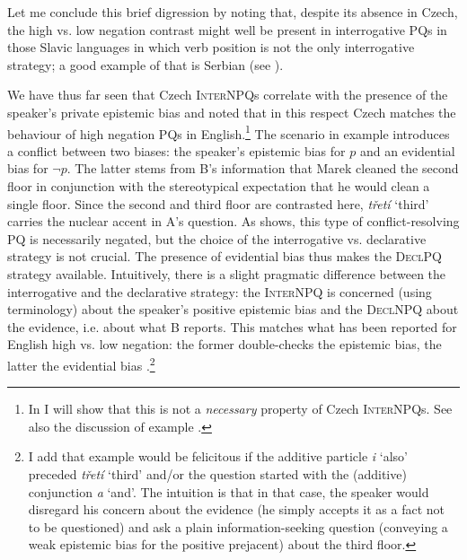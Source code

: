 \documentclass[output=paper,colorlinks,citecolor=brown]{langscibook}
\begin{document}
\noindent Let me conclude this brief digression by noting that, despite its absence in Czech, the high vs. low negation contrast might well be present in interrogative PQs in those Slavic languages in which verb position is not the only interrogative strategy; a good example of that is Serbian (see ).

We have thus far seen that Czech \textsc{InterNPQ}s correlate with the presence of the speaker's private epistemic bias and noted that in this respect Czech matches the behaviour of high negation PQs in English.\footnote{In  I will show that this is not a \textit{necessary} property of Czech \textsc{InterNPQ}s. See also the discussion of example .} The scenario in example  introduces a conflict between two biases: the speaker's epistemic bias for $p$ and an evidential bias for $\neg p$. The latter stems from B's information that Marek cleaned the second floor in conjunction with the stereotypical expectation that he would clean a single floor. Since the second and third floor are contrasted here, \textit{třetí} `third' carries the nuclear accent in A's question. As  shows, this type of conflict-resolving PQ is necessarily negated, but the choice of the interrogative vs. declarative strategy is not crucial. The presence of evidential bias thus makes the \textsc{DeclPQ} strategy available. Intuitively, there is a slight pragmatic difference between the interrogative and the declarative strategy: the \textsc{InterNPQ} is concerned (using  terminology) about the speaker's positive epistemic bias and the \textsc{DeclNPQ} about the evidence, i.e. about what B reports. This matches what has been reported for English high vs. low negation: the former double-checks the epistemic bias, the latter the evidential bias \citep{Romero.Han2004,Repp2013}.\footnote{I add that example  would be felicitous if the additive particle \textit{i} `also' preceded \textit{třetí} `third' and/or the question started with the (additive) conjunction \textit{a} `and'. The intuition is that in that case, the speaker would disregard his concern about the evidence (he simply accepts it as a fact not to be questioned) and ask a plain information-seeking question (conveying a weak epistemic bias for the positive prejacent) about the third floor.\label{sim:fn:disregard-evidential}}
\end{document}
